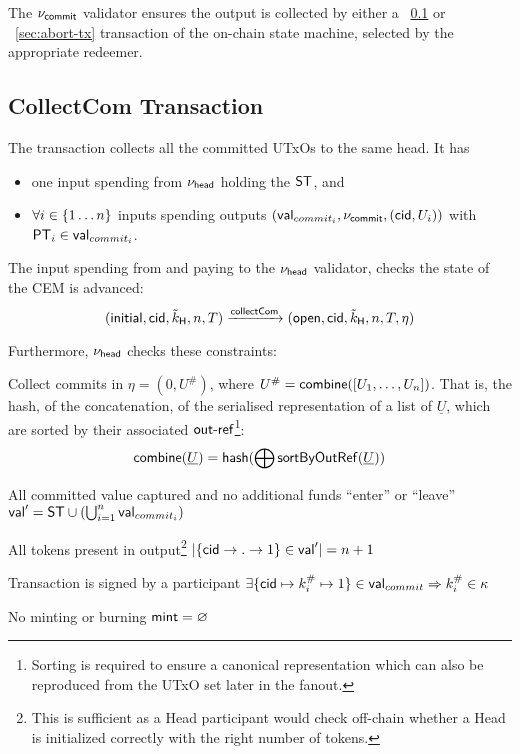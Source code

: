 \noindent The $\nu_\mathsf{commit}$ validator ensures the output is collected by either a \mtxCCom{}~\ref{sec:collect-tx} or \mtxAbort{}~\ref{sec:abort-tx} transaction of the on-chain state machine, selected by the appropriate redeemer.

\subsection{CollectCom Transaction}\label{sec:collect-tx}



\noindent The \mtxCCom{} transaction collects all the committed UTxOs to the same head. It has
\begin{itemize}
  \item one input spending from $\nu_\mathsf{head}$ holding the $\mathsf{ST}$, and
  \item $\forall i \in \{1 \dots n\}$ inputs spending \mtxCom{} outputs $(\mathsf{val}_{commit_i}, \nu_\mathsf{commit}, (\mathsf{cid}, U_{i}))$ with $\mathsf{PT}_{i} \in \mathsf{val}_{commit_{i}}$.
\end{itemize}
The input spending from and paying to the $\nu_\mathsf{head}$ validator, checks the state
of the CEM is advanced:
\[
   (\mathsf{initial},\mathsf{cid},\tilde{k}_{\mathsf{H}},n,T) \xrightarrow{\mathsf{collectCom}} (\mathsf{open},\mathsf{cid},\tilde{k}_{\mathsf{H}},n,T,\eta)
\]

\noindent Furthermore, $\nu_\mathsf{head}$ checks these constraints:
\begin{menumerate}
  \item Collect commits in $\eta = (0, U^{\#})$, where
  $U^{\#} = \mathsf{combine}([U_{1}, \dots, U_{n}])$. That is, the hash, of the
  concatenation, of the serialised representation of a list of $\underline{U}$,
  which are sorted by their associated $\mathsf{out\textsf{-}{}ref}$\footnote{Sorting is required
    to ensure a canonical representation which can also be reproduced from the
    UTxO set later in the fanout.}: 
  \[
    \mathsf{combine}(\underline{U}) = \mathsf{hash}(\bigoplus \mathsf{sortByOutRef}(\underline{U}))
  \]
  \item All committed value captured and no additional funds ``enter'' or ``leave''\\
  $\mathsf{val}' = \mathsf{ST} \cup (\bigcup_{i=1}^{n} \mathsf{val}_{commit_i})$
  \item All tokens present in output\footnote{This is sufficient as a Head participant would check off-chain whether a Head is initialized correctly with the right number of tokens.}
  $|\{\mathsf{cid} \rightarrow . \rightarrow 1\} \in \mathsf{val}'| = n + 1$
  \item Transaction is signed by a participant $\exists \{\mathsf{cid} \mapsto k^{\#}_{i} \mapsto 1\} \in \mathsf{val}_{commit} \Rightarrow k^{\#}_{i} \in \kappa$
  \item No minting or burning  $\mathsf{mint} = \varnothing$
\end{menumerate}

